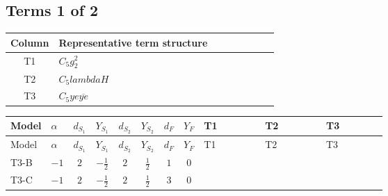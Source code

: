 \documentclass[8pt]{article}
\begin{document}
\begin{landscape}
\subsection*{Terms 1 of 2}
\begin{center}
\begin{tabular}{@{}c >{\raggedright\arraybackslash}p{0.82\linewidth}@{}}
\toprule
Column & Representative term structure \\
\midrule
T1 & \(\displaystyle C_{5} g_{2}^{2}\) \\
\midrule
T2 & \(\displaystyle C_{5} lambdaH\) \\
\midrule
T3 & \(\displaystyle C_{5} ye \overline{ye}\) \\
\midrule
\bottomrule
\end{tabular}
\end{center}
\smallskip
\tiny
\begin{longtable}{@{}llcccccc >{\raggedright\arraybackslash}p{0.21\linewidth} >{\raggedright\arraybackslash}p{0.21\linewidth} >{\raggedright\arraybackslash}p{0.21\linewidth}@{}}
\toprule
Model & $\alpha$ & $d_{S_1}$ & $Y_{S_1}$ & $d_{S_2}$ & $Y_{S_2}$ & $d_F$ & $Y_F$ & T1 & T2 & T3 \\
\midrule
\endfirsthead
\toprule
Model & $\alpha$ & $d_{S_1}$ & $Y_{S_1}$ & $d_{S_2}$ & $Y_{S_2}$ & $d_F$ & $Y_F$ & T1 & T2 & T3 \\
\midrule
\endhead
T3-B & $-1$ & $2$ & $-\frac{1}{2}$ & $2$ & $\frac{1}{2}$ & $1$ & $0$ & \scriptsize\adjustbox{max width=\linewidth}{$\begin{gathered} - 3 C_{5} g_{2}^{2}\end{gathered}$} & \scriptsize\adjustbox{max width=\linewidth}{$\begin{gathered} 2 C_{5} lambdaH\end{gathered}$} & \scriptsize\adjustbox{max width=\linewidth}{$\begin{gathered} - C_{5} ye \overline{ye}\end{gathered}$} \\
\midrule
T3-C & $-1$ & $2$ & $-\frac{1}{2}$ & $2$ & $\frac{1}{2}$ & $3$ & $0$ & \scriptsize\adjustbox{max width=\linewidth}{$\begin{gathered} - 3 C_{5} g_{2}^{2}\end{gathered}$} & \scriptsize\adjustbox{max width=\linewidth}{$\begin{gathered} 2 C_{5} lambdaH\end{gathered}$} & \scriptsize\adjustbox{max width=\linewidth}{$\begin{gathered} - C_{5} ye \overline{ye}\end{gathered}$} \\

\end{longtable}
\end{landscape}
\end{document}
